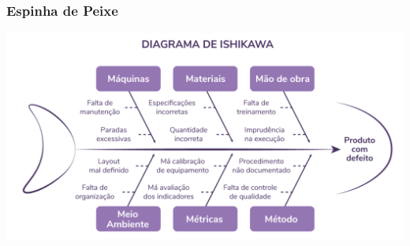 \documentclass[aspectratio=169]{beamer}
\begin{document}
\begin{frame}
	\frametitle{Espinha de Peixe}
	
	\begin{center}
		\includegraphics[scale=0.3]{img/diagrama-de-ishikawa}
	\end{center}
\end{frame}
\end{document}
